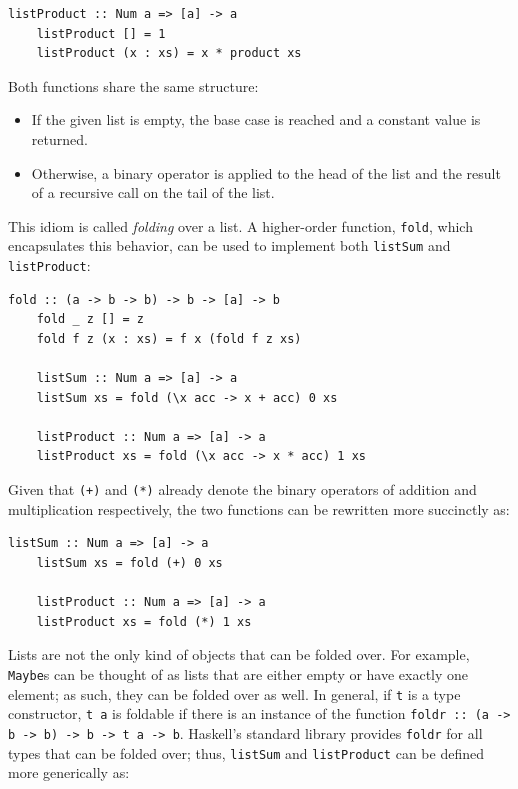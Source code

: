 \documentclass[UdineBachThesis,american,11pt]{PhdThesis}
\begin{document}
  \pagebreak

  \begin{Verbatim}[gobble=4,fontsize=\small]
    listProduct :: Num a => [a] -> a
    listProduct [] = 1
    listProduct (x : xs) = x * product xs
  \end{Verbatim}

  Both functions share the same structure:

  \begin{itemize}
    \item If the given list is empty, the base case is reached and a constant
    value is returned.

    \item Otherwise, a binary operator is applied to the head of the list and
    the result of a recursive call on the tail of the list.
  \end{itemize}

  This idiom is called \emph{folding} over a list. A higher-order function,
  \mbox{\texttt{fold}}, which encapsulates this behavior, can be used to
  implement both \mbox{\texttt{listSum}} and \mbox{\texttt{listProduct}}:

  \begin{Verbatim}[gobble=4,fontsize=\small]
    fold :: (a -> b -> b) -> b -> [a] -> b
    fold _ z [] = z
    fold f z (x : xs) = f x (fold f z xs)

    listSum :: Num a => [a] -> a
    listSum xs = fold (\x acc -> x + acc) 0 xs

    listProduct :: Num a => [a] -> a
    listProduct xs = fold (\x acc -> x * acc) 1 xs
  \end{Verbatim}

  Given that \mbox{\texttt{(+)}} and \mbox{\texttt{(*)}} already denote the
  binary operators of addition and multiplication respectively, the two
  functions can be rewritten more succinctly as:

  \begin{Verbatim}[gobble=4,fontsize=\small]
    listSum :: Num a => [a] -> a
    listSum xs = fold (+) 0 xs

    listProduct :: Num a => [a] -> a
    listProduct xs = fold (*) 1 xs
  \end{Verbatim}

  Lists are not the only kind of objects that can be folded over. For example,
  \mbox{\texttt{Maybe}s} can be thought of as lists that are either empty or
  have exactly one element; as such, they can be folded over as well. In
  general, if \texttt{t} is a type constructor, \mbox{\texttt{t a}} is foldable
  if there is an instance of the function
  \mbox{\texttt{foldr :: (a -> b -> b) -> b -> t a -> b}}. Haskell's standard
  library provides \mbox{\texttt{foldr}} for all types that can be folded over;
  thus, \mbox{\texttt{listSum}} and \mbox{\texttt{listProduct}} can be defined
  more generically as:
\end{document}
